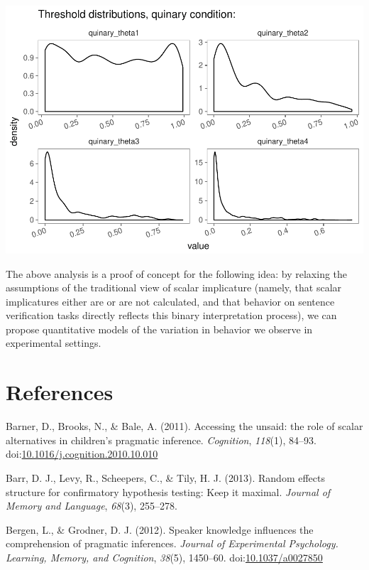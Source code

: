 \documentclass[floatsintext,man]{apa6}
\theoremstyle{definition}
\theoremstyle{definition}
\theoremstyle{definition}
\theoremstyle{remark}
\begin{document}
\includegraphics{writeup_files/figure-latex/unnamed-chunk-1-4.pdf}

The above analysis is a proof of concept for the following idea: by
relaxing the assumptions of the traditional view of scalar implicature
(namely, that scalar implicatures either are or are not calculated, and
that behavior on sentence verification tasks directly reflects this
binary interpretation process), we can propose quantitative models of
the variation in behavior we observe in experimental settings.

\section{References}\label{references}

\setlength{\parindent}{-0.5in} \setlength{\leftskip}{0.5in}

\hypertarget{refs}{}
\hypertarget{ref-Barner2011}{}
Barner, D., Brooks, N., \& Bale, A. (2011). Accessing the unsaid: the
role of scalar alternatives in children's pragmatic inference.
\emph{Cognition}, \emph{118}(1), 84--93.
doi:\href{https://doi.org/10.1016/j.cognition.2010.10.010}{10.1016/j.cognition.2010.10.010}

\hypertarget{ref-barr2013random}{}
Barr, D. J., Levy, R., Scheepers, C., \& Tily, H. J. (2013). Random
effects structure for confirmatory hypothesis testing: Keep it maximal.
\emph{Journal of Memory and Language}, \emph{68}(3), 255--278.

\hypertarget{ref-Bergen2012}{}
Bergen, L., \& Grodner, D. J. (2012). Speaker knowledge influences the
comprehension of pragmatic inferences. \emph{Journal of Experimental
Psychology. Learning, Memory, and Cognition}, \emph{38}(5), 1450--60.
doi:\href{https://doi.org/10.1037/a0027850}{10.1037/a0027850}
\end{document}
